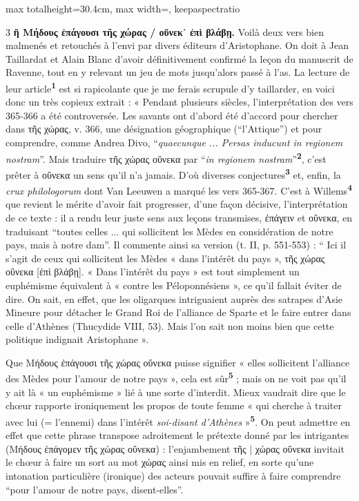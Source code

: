 \documentclass[11pt,twoside]{book}
\newcommand{\italique}[1]{\textit{#1}}
\newcommand{\latin}[1]{\textit{#1}}
\newcommand{\marqueur}[1]{\textsuperscript{\color{rubricRed}\textbf{#1}}}
\begin{document}
\begin{adjustbox}{max totalheight=30.4cm, max width=\textwidth, keepaspectratio}
\begin{minipage}{\textwidth}
{\begin{multicols}{3}
 \textbf{ἢ Μήδους ἐπάγουσι τῆς χώρας / οὕνεκ᾽ ἐπὶ βλάβῃ.} Voilà deux vers bien malmenés et retouchés à l'envi par divers éditeurs d'Aristophane. On doit à Jean Taillardat et Alain Blanc d'avoir définitivement confirmé la leçon du manuscrit de Ravenne, tout en y relevant un jeu de mots jusqu'alors passé à l'as. La lecture de leur article\marqueur{1} est si rapicolante que je me ferais scrupule d'y taillarder, en voici donc un très copieux extrait : « Pendant plusieurs siècles, l'interprétation des vers 365-366 a été controversée. Les savants ont d'abord été d'accord pour chercher dans τῆς χώρας, v. 366, une désignation géographique (“l'Attique”) et pour comprendre, comme Andrea Divo, “\latin{quaecunque ... Persas inducunt in regionem nostram}”. Mais traduire τῆς χώρας οὕνεκα par “\latin{in regionem nostram}”\marqueur{2}, c'est prêter à οὕνεκα un sens qu'il n'a jamais. D'où diverses conjectures\marqueur{3} et, enfin, la \italique{crux philologorum} dont Van Leeuwen a marqué les vers 365-367. C'est à Willems\marqueur{4} que revient le mérite d'avoir fait progresser, d'une façon décisive, l'interprétation de ce texte : il a rendu leur juste sens aux leçons transmises, ἐπάγειν et οὕνεκα, en traduisant “toutes celles ... qui sollicitent les Mèdes en considération de notre pays, mais à notre dam”. Il commente ainsi sa version (t. II, p. 551-553) : “ Ici il s'agit de ceux qui sollicitent les Mèdes « dans l'intérêt du pays », τῆς χώρας οὕνεκα [ἐπὶ βλάβῃ]. « Dans l'intérêt du pays » est tout simplement un euphémisme équivalent à « contre les Péloponnésiens », ce qu'il fallait éviter de dire. On sait, en effet, que les oligarques intriguaient auprès des satrapes d'Asie Mineure pour détacher le Grand Roi de l'alliance de Sparte et le faire entrer dans celle d'Athènes (Thucydide VIII, 53). Mais l'on sait non moins bien que cette politique indignait Aristophane ».
\par\vspace{1.5pt}
\noindent Que Μήδους ἐπάγουσι τῆς χώρας οὕνεκα puisse signifier « elles sollicitent l'alliance des Mèdes pour l'amour de notre pays », cela est sûr\marqueur{5} ; mais on ne voit pas qu'il y ait là « un euphémisme » lié à une sorte d'interdit. Mieux vaudrait dire que le chœur rapporte ironiquement les propos de toute femme « qui cherche à traiter avec lui (= l'ennemi) dans l'intérêt \italique{soi-disant d'Athènes} »\marqueur{5}. On peut admettre en effet que cette phrase transpose adroitement le prétexte donné par les intrigantes (Μήδους ἐπάγομεν τῆς χώρας οὕνεκα) : l'enjambement τῆς | χώρας οὕνεκα invitait le chœur à faire un sort au mot χώρας ainsi mis en relief, en sorte qu'une intonation particulière (ironique) des acteurs pouvait suffire à faire comprendre “pour l'amour de notre pays, disent-elles”.

\end{multicols}}
\end{minipage}
\end{adjustbox}
\end{document}
